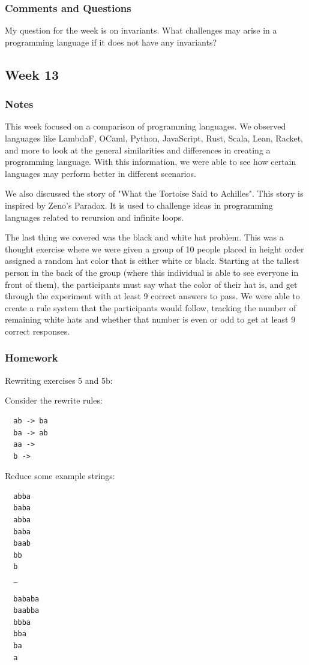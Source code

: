 \documentclass{article}
\theoremstyle{theorem}
\theoremstyle{definition}
\theoremstyle{remark}
\begin{document}
\subsubsection*{Comments and Questions}
My question for the week is on invariants. What challenges may arise in a programming
language if it does not have any invariants?
\subsection{Week 13}
\subsubsection*{Notes}
This week focused on a comparison of programming languages. We observed languages like 
LambdaF, OCaml, Python, JavaScript, Rust, Scala, Lean, Racket, and more to look at the 
general similarities and differences in creating a programming language. With this information,
we were able to see how certain languages may perform better in different scenarios. 

We also
discussed the story of "What the Tortoise Said to Achilles". This story is inspired by 
Zeno's Paradox. It is used to challenge ideas in programming languages related to recursion and 
infinite loops. 

The last thing we covered was the black and white hat problem. This was a thought exercise where we were 
given a group of 10 people placed in height order assigned a random hat color that is either white or black. 
Starting at the tallest person in the back of the group (where this individual is able to see everyone in 
front of them), the participants must say what the color of their hat is, and get through the experiment 
with at least 9 correct answers to pass. We were able to create a rule system that the participants would 
follow, tracking the number of remaining white hats and whether that number is even or odd to get at least 
9 correct responses. 
\subsubsection*{Homework}
Rewriting exercises 5 and 5b:

Consider the rewrite rules:
\begin{verbatim}
  ab -> ba
  ba -> ab
  aa ->
  b ->
\end{verbatim}
Reduce some example strings:
\begin{verbatim}
  abba
  baba 
  abba 
  baba 
  baab 
  bb 
  b 
  _
\end{verbatim}
\begin{verbatim}
  bababa
  baabba 
  bbba 
  bba 
  ba 
  a 
\end{verbatim}
\end{document}

